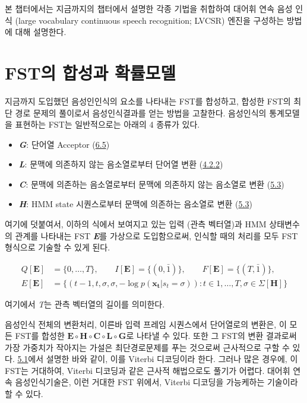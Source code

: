 \documentclass[../main.tex]{subfiles}
\begin{document}
\noindent
본 챕터에서는 지금까지의 챕터에서 설명한 각종 기법을 취합하여 대어휘 연속 음성 인식 (large vocabulary continuous speech recognition; LVCSR) 엔진을 구성하는 방법에 대해 설명한다. 

\section{FST의 합성과 확률모델}
지금까지 도입했던 음성인인식의 요소를 나타내는 FST를 합성하고, 합성한 FST의 최단 경로 문제의 풀이로서 음성인식결과를 얻는 방법을 고찰한다. 음성인식의 통계모델을 표현하는 FST는 일반적으로는 아래의 4 종류가 있다. 

\begin{itemize}
    \item \textbf{\textit{G}}: 단어열 Acceptor (\hyperref[sec:N-gram-FST]{6.5})
    \item \textbf{\textit{L}}: 문맥에 의존하지 않는 음소열로부터 단어열 변환 (\hyperref[subsec:pronunciation-model]{4.2.2})
    \item \textbf{\textit{C}}: 문맥에 의존하는 음소열로부터 문맥에 의존하지 않는 음소열로 변환 (\hyperref[sec:context-dependant-model]{5.3})
    \item \textbf{\textit{H}}: HMM state 시퀀스로부터 문맥에 의존하는 음소열로 변환 (\hyperref[sec:context-dependant-model]{5.3})
\end{itemize}
여기에 덧붙여서, 이하의 식에서 보여지고 있는 입력 (관측 벡터열)과 HMM 상태변수의 관계를 나타내는 FST \textbf{\textit{E}}를 가상으로 도입함으로써, 인식할 때의 처리를 모두 FST 형식으로 기술할 수 있게 된다. 

\begin{equation}\label{eq:7_1}
    \begin{split}
    Q[\bm{E}] &= \{0,\ldots,T\}, \qquad I[\bm{E}] = \{(0,\bar{1})\}, \qquad F[\bm{E}] = \{(T,\bar{1})\}, \\
    E[\bm{E}] &= \{(t-1, t, \sigma, \sigma, -\log p(\mathbf{x_t} | s_t = \sigma)): t \in {1, \ldots, T}, \sigma \in \Sigma[\bm{H}] \}
    \end{split}
\end{equation}

여기에서 \textit{T}는 관측 벡터열의 길이를 의미한다. 

음성인식 전체의 변환처리, 이른바 입력 프레임 시퀀스에서 단어열로의 변환은, 이 모든 FST를 합성한 $\bm{E} \circ \bm{H} \circ \bm{C} \circ \bm{L} \circ \bm{G}$로 나타낼 수 있다.
또한 그 FST의 변환 결과로써 가장 가중치가 작아지는 가설은 최단경로문제를 푸는 것으로써 근사적으로 구할 수 있다.
\hyperref[sec:HMM]{5.1}에서 설명한 바와 같이, 이를 Viterbi 디코딩이라 한다. 
그러나 많은 경우에, 이 FST는 거대하여, Viterbi 디코딩과 같은 근사적 해법으로도 풀기가 어렵다. 
대어휘 연속 음성인식기술은, 이런 거대한 FST 위에서, Viterbi 디코딩을 가능케하는 기술이라 할 수 있다. 
\end{document}
